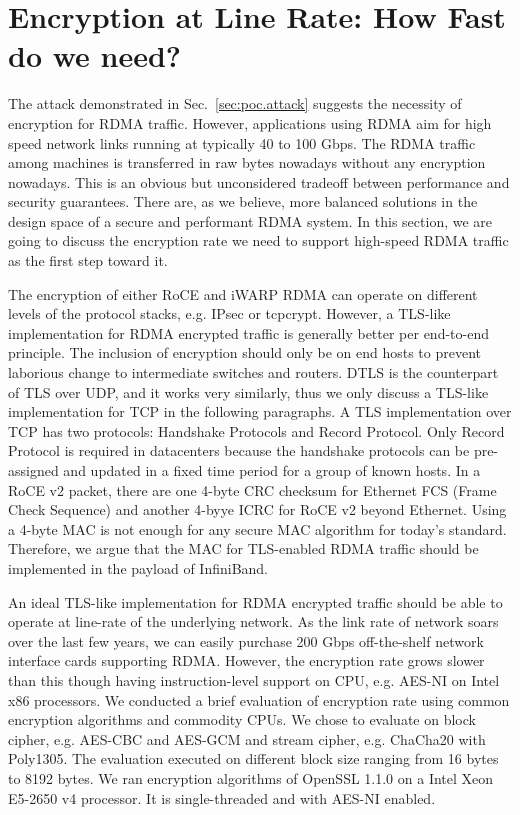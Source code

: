 \section{Encryption at Line Rate: How Fast do we need?}

The attack demonstrated in Sec.~\ref{sec:poc.attack} suggests the necessity of encryption for RDMA traffic.
However, applications using RDMA aim for high speed network links running at typically 40 to 100 Gbps.
The RDMA traffic among machines is transferred in raw bytes nowadays without any encryption nowadays.
This is an obvious but unconsidered tradeoff between performance and security guarantees.
There are, as we believe, more balanced solutions in the design space of a secure and performant RDMA system.
In this section, we are going to discuss the encryption rate we need to support high-speed RDMA traffic
as the first step toward it.

The encryption of either RoCE and iWARP RDMA can operate on different levels of the protocol stacks, e.g. IPsec or tcpcrypt. However, a TLS-like implementation for RDMA encrypted traffic is generally better per end-to-end principle.
The inclusion of encryption should only be on end hosts to prevent laborious change to intermediate switches and routers.
DTLS is the counterpart of TLS over UDP, and it works very similarly, thus we only discuss a TLS-like implementation for TCP in the following paragraphs. A TLS implementation over TCP has two protocols: Handshake Protocols and Record Protocol. Only Record Protocol is required in datacenters because the handshake protocols can be pre-assigned and updated in a fixed time period for a group of known hosts. In a RoCE v2 packet, there are one 4-byte CRC checksum for Ethernet FCS (Frame Check Sequence) and another 4-byye ICRC for RoCE v2 beyond Ethernet. Using a 4-byte MAC is not enough for any secure MAC algorithm for today's standard. Therefore, we argue that the MAC for TLS-enabled RDMA traffic should be implemented in the payload of InfiniBand.

An ideal TLS-like implementation for RDMA encrypted traffic should be able to operate at line-rate of the underlying network. As the link rate of network soars over the last few years, we can easily purchase 200 Gbps off-the-shelf network interface cards supporting RDMA. However, the encryption rate grows slower than this though having instruction-level support on CPU, e.g. AES-NI on Intel x86 processors. We conducted a brief evaluation of encryption rate using common encryption algorithms and commodity CPUs. We chose to evaluate on block cipher, e.g. AES-CBC and AES-GCM and stream cipher, e.g. ChaCha20 with Poly1305. The evaluation executed on different block size ranging from 16 bytes to 8192 bytes. We ran encryption algorithms of OpenSSL 1.1.0 on a Intel Xeon E5-2650 v4 processor. It is single-threaded and with AES-NI enabled.

